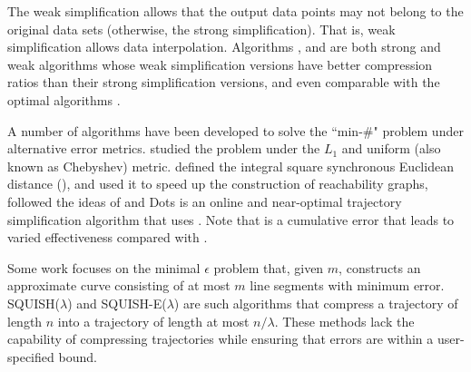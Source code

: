 The weak simplification allows that the output data points may not belong to the original data sets \cite{Trajcevski:DDR} (otherwise, the strong simplification).
That is, weak simplification allows data interpolation. Algorithms \sleeve \cite{Zhao:Sleeve}, \operb\cite{Lin:Operb} and \cised \cite{Lin:Cised} are both strong and weak \lsa algorithms whose weak simplification versions have better compression ratios than their strong simplification versions, and even comparable with the optimal algorithms \cite{Lin:Cised}.

A number of algorithms \cite{Agarwal:Metric, Chen:Fast, Wu:Graph,Cao:Dots} have been developed to solve the ``min-\#" problem under alternative error metrics.
\cite{Agarwal:Metric} studied the problem under the $L_1$ and uniform (also known as Chebyshev) metric. %
\cite{Chen:Fast} defined  the integral square synchronous Euclidean distance (), and used it to speed up the construction of reachability graphs, \cite{Wu:Graph} followed the ideas of \cite{Chen:Fast} and Dots\cite{Cao:Dots} is an online and near-optimal trajectory simplification algorithm that uses .
Note that  is a cumulative error that leads to varied effectiveness compared with \sed.



Some work focuses on the minimal $\epsilon$ problem \cite{Chan:Optimal} that, given $m$, constructs an approximate curve consisting of at most $m$ line segments with minimum error. SQUISH($\lambda$) \cite{Muckell:SQUISH} and SQUISH-E($\lambda$) \cite{Muckell:Compression} are such algorithms that compress a trajectory of length $n$ into a trajectory of length at most $n/\lambda$.
These methods lack the capability of compressing trajectories while ensuring that \sed errors are within a user-specified bound\cite{Muckell:Compression}.




